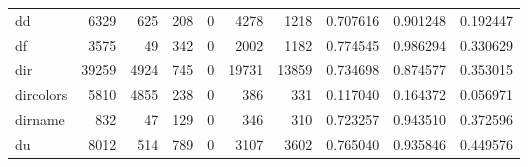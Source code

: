 \begin{longtable}{lrrrrrrrrr}
dd        &                                6329 &                                             625 &                                            208 &                                             0 &                                           4278 &                                         1218 &                                           0.707616 &                               0.901248 &                             0.192447 \\
df        &                                3575 &                                              49 &                                            342 &                                             0 &                                           2002 &                                         1182 &                                           0.774545 &                               0.986294 &                             0.330629 \\
dir       &                               39259 &                                            4924 &                                            745 &                                             0 &                                          19731 &                                        13859 &                                           0.734698 &                               0.874577 &                             0.353015 \\
dircolors &                                5810 &                                            4855 &                                            238 &                                             0 &                                            386 &                                          331 &                                           0.117040 &                               0.164372 &                             0.056971 \\
dirname   &                                 832 &                                              47 &                                            129 &                                             0 &                                            346 &                                          310 &                                           0.723257 &                               0.943510 &                             0.372596 \\
du        &                                8012 &                                             514 &                                            789 &                                             0 &                                           3107 &                                         3602 &                                           0.765040 &                               0.935846 &                             0.449576 \\

\end{longtable}

